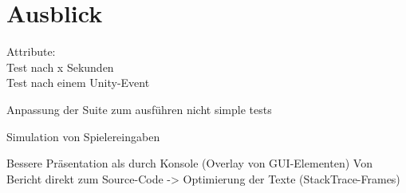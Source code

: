 \chapter{Ausblick}

Attribute:\\
Test nach x Sekunden\\
Test nach einem Unity-Event

Anpassung der Suite zum ausführen nicht simple tests

Simulation von Spielereingaben

Bessere Präsentation als durch Konsole (Overlay von GUI-Elementen)
Von Bericht direkt zum Source-Code -> Optimierung der Texte (StackTrace-Frames)